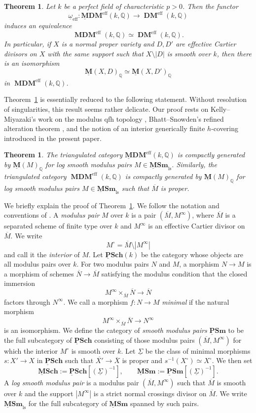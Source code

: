 \documentclass[11pt]{amsart}
\newcommand{\Q}{\mathbb{Q}}
\newcommand{\ul}[1]{{\underline{#1}}}
\newcommand{\DM}{\operatorname{\mathbf{DM}}}
\newcommand{\MDM}{\operatorname{\mathbf{MDM}}}
\newcommand{\ulMDM}{\operatorname{\mathbf{\underline{M}DM}}}
\newcommand{\eff}{{\operatorname{eff}}}
\newcommand{\ol}{\overline}
\newcommand{\M}{\mathbf{M}}
\newcommand{\ulM}{\underline{\M}}
\newcommand{\ulMSm}{\operatorname{\mathbf{\underline{M}Sm}}}
\newcommand{\ulPSCH}{\operatorname{\mathbf{\underline{P}Sch}}}
\newcommand{\ulMSCH}{\operatorname{\mathbf{\underline{M}Sch}}}
\newcommand{\ulPSm}{\operatorname{\mathbf{\underline{P}Sm}}}
\def\Minf{M^{\infty}}
\newcommand{\ulMSmls}{{\ulMSm}_{\text{ls}}}
\newtheorem{thm}[lemma]{Theorem}
\theoremstyle{definition}
\theoremstyle{remark}
\numberwithin{equation}{section}
\begin{document}
\begin{thm}\label{main}
Let $k$ be a perfect field of characteristic $p>0$. Then the functor
\[
\underline{\omega}_{\eff}:\ulMDM^\eff(k,\Q)\to \DM^\eff(k,\Q)
\]
induces an equivalence
\[
\MDM^\eff(k,\Q)\simeq \DM^\eff(k,\Q).
\]
In particular, if $X$ is a normal proper variety and $D,D'$ are effective Cartier divisors on $X$ with the same support such that $X\setminus |D|$ is smooth over $k$, then there is an isomorphism
\[
\ulM(X,D)_\Q \simeq \ulM(X,D')_\Q
\]
in $\MDM^\eff(k,\Q)$.
\end{thm}

Theorem~\ref{main} is essentially reduced to the following statement. Without resolution of singularities, this result seems rather delicate. Our proof rests on Kelly--Miyazaki's work on the modulus qfh topology \cite{KM21}, Bhatt--Snowden's refined alteration theorem \cite{BS17}, and the notion of an interior generically finite $h$-covering introduced in the present paper.

\begin{thm}\label{main3}
The triangulated category $\ulMDM^\eff(k,\Q)$ is compactly generated by $\ulM(M)_\Q$ for log smooth modulus pairs $M \in \ulMSmls$. Similarly, the triangulated category $\MDM^\eff(k,\Q)$ is compactly generated by $\ulM(M)_\Q$ for log smooth modulus pairs $M \in \ulMSmls$ such that $\ol{M}$ is proper.
\end{thm}

We briefly explain the proof of Theorem~\ref{main3}. We follow the notation and conventions of \cite{KM21}. A \textit{modulus pair} $M$ over $k$ is a pair $(\ol{M},\Minf)$, where $\ol{M}$ is a separated scheme of finite type over $k$ and $\Minf$ is an effective Cartier divisor on $\ol{M}$. We write
\[
M^\circ = \ol{M}\setminus |M^\infty|
\]
and call it the \textit{interior} of $M$. Let $\ulPSCH(k)$ be the category whose objects are all modulus pairs over $k$. For two modulus pairs $N$ and $M$, a morphism $N\to M$ is a morphism of schemes $\ol{N}\to \ol{M}$ satisfying the modulus condition that the closed immersion
\[
M^\infty \times_{\ol{M}} \ol{N} \to \ol{N}
\]
factors through $N^\infty$. We call a morphism $f:N \to M$ \textit{minimal} if the natural morphism
\[
M^\infty \times_{\ol{M}} \ol{N} \to N^\infty
\]
is an isomorphism. We define the category of \textit{smooth modulus pairs} $\ulPSm$ to be the full subcategory of $\ulPSCH$ consisting of those modulus pairs $(\ol{M},\Minf)$ for which the interior $M^\circ$ is smooth over $k$. Let $\ul{\Sigma}$ be the class of minimal morphisms $s:X' \to X$ in $\ulPSCH$ such that $\ol{X'} \to \ol{X}$ is proper and $s^{-1}(X^\circ)\simeq X^\circ$. We then set
\[
\ulMSCH:= \ulPSCH[(\ul{\Sigma})^{-1}], \qquad \ulMSm:= \ulPSm[(\ul{\Sigma})^{-1}].
\]
A \textit{log smooth modulus pair} is a modulus pair $(\ol{M},M^\infty)$ such that $\ol{M}$ is smooth over $k$ and the support $|M^\infty|$ is a strict normal crossings divisor on $\ol{M}$. We write $\ulMSmls$ for the full subcategory of $\ulMSm$ spanned by such pairs.
\end{document}
